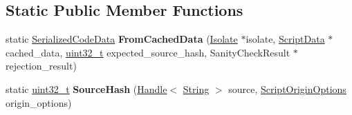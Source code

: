 \subsection*{Static Public Member Functions}
\begin{DoxyCompactItemize}
\item 
\mbox{\label{classv8_1_1internal_1_1SerializedCodeData_a845545d38f02d84d90c8d98c54252c06}} 
static \mbox{\hyperlink{classv8_1_1internal_1_1SerializedCodeData}{Serialized\+Code\+Data}} {\bfseries From\+Cached\+Data} (\mbox{\hyperlink{classv8_1_1internal_1_1Isolate}{Isolate}} $\ast$isolate, \mbox{\hyperlink{classv8_1_1internal_1_1ScriptData}{Script\+Data}} $\ast$cached\+\_\+data, \mbox{\hyperlink{classuint32__t}{uint32\+\_\+t}} expected\+\_\+source\+\_\+hash, Sanity\+Check\+Result $\ast$rejection\+\_\+result)
\item 
\mbox{\label{classv8_1_1internal_1_1SerializedCodeData_a769a3dd68a555a655664812ce6077d1a}} 
static \mbox{\hyperlink{classuint32__t}{uint32\+\_\+t}} {\bfseries Source\+Hash} (\mbox{\hyperlink{classv8_1_1internal_1_1Handle}{Handle}}$<$ \mbox{\hyperlink{classv8_1_1internal_1_1String}{String}} $>$ source, \mbox{\hyperlink{classv8_1_1ScriptOriginOptions}{Script\+Origin\+Options}} origin\+\_\+options)
\end{DoxyCompactItemize}
